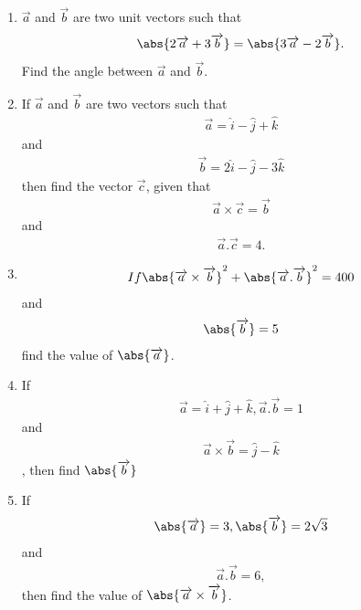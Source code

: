 \begin{enumerate}
\item $\overrightarrow{a}$   and  $\overrightarrow{ b}$ are two unit vectors such that \begin{align} \abs { 2\overrightarrow{ a}+3\overrightarrow{ b}} = \abs{3\overrightarrow{ a} - 2\overrightarrow{ b}}. \end{align} Find the angle between $\overrightarrow{ a }$ and $\overrightarrow{ b }$.
\item If $\overrightarrow{ a}$  and $\overrightarrow{b}$ are two vectors such that  \begin{align}\overrightarrow{a} = \hat{i} - \hat{j} + \hat{k} \end{align}and  \begin{align}\overrightarrow{b} = 2\hat{i} - \hat{j} - 3\hat{k}\end{align} then find the vector $\overrightarrow{c}$, given that \begin{align}\overrightarrow{a} \times \overrightarrow{c} = \overrightarrow{b}\end{align}  and \begin{align}\overrightarrow{a}.\overrightarrow{c}= 4.\end{align}
\item \begin{align} If \abs{\overrightarrow{ a } \times \overrightarrow { b }}^2 + \abs { \overrightarrow{ a } . \overrightarrow{ b }}^2= 400 \end{align} and  \begin{align}\abs { \overrightarrow{ b}} = 5 \end{align} find the value of  $\abs{\overrightarrow{ a }}$. 
\item If \begin{align}\overrightarrow{a} = \hat{i} + \hat{ j} + \hat{ k} , \overrightarrow{a} . \overrightarrow{b} = 1\end{align}  and \begin{align}\overrightarrow{a} \times \overrightarrow{b} = \hat{j} - \hat{k}\end{align},  then find  $\abs{\overrightarrow{b}}$ 
\item If \begin{align}\abs{\overrightarrow{ a}}= 3, \abs{\overrightarrow{ b}} = 2\sqrt{ 3}\end{align}  and \begin{align}\overrightarrow{ a} . \overrightarrow{ b} = 6,\end{align}then find the value of $\abs{\overrightarrow{ a} \times \overrightarrow{ b}}$.

\end{enumerate}

